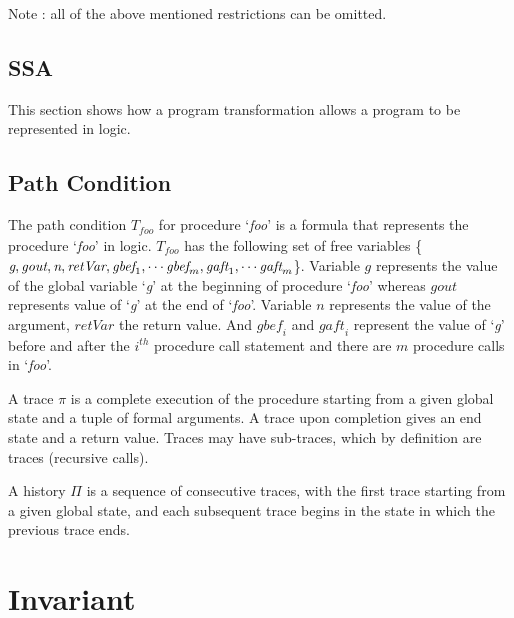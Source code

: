 \documentclass{llncs}
\newcommand{\foo}{\textit{foo}}
\newcommand{\trace}{\pi}
\newcommand{\history}{\Pi}
\newcommand{\pathCondition}{\mathit{T_{\foo}}}
\newcommand{\retVar}{\textit{retVar}}
\newcommand{\n}{\textit{n}}
\newcommand{\g}{\textit{g}}
\newcommand{\gout}{\textit{gout}}
\newcommand{\gbef}{\textit{gbef}}
\newcommand{\gaft}{\textit{gaft}}
\begin{document}
Note : all of the above mentioned restrictions can be omitted.
\subsection{SSA}
This section shows how a program transformation allows a program to be
represented in logic.

\subsection{Path Condition}

  The path condition $\pathCondition$ for procedure `\foo' is a
  formula that represents the procedure `\foo' in logic.
  $\pathCondition$ has the following set of free variables \{$\g,
  \gout,\n,\\ \retVar, \gbef_1, \cdots \gbef_m, \gaft_1, \cdots
  \gaft_m$\}. Variable $\g$ represents the value of the global
  variable `\g' at the beginning of procedure `\foo' whereas $\gout$
  represents value of `\g' at the end of `\foo'. Variable $\n$
  represents the value of the argument, $\retVar$ the return
  value. And $\gbef_i$ and $\gaft_i$ represent the value of `\g' before
  and after the $i^{th}$ procedure call statement and there are $m$
  procedure calls in `\foo'.

\begin{definition}[trace]
  A trace $\trace$ is a complete execution of the procedure starting
  from a given global state and a tuple of formal arguments. A trace
  upon completion gives an end state and a return value. Traces may
  have sub-traces, which by definition are traces (recursive calls).
\end{definition}

\begin{definition}[history]
  A history $\history$ is a sequence of consecutive traces, with the
  first trace starting from a given global state, and each subsequent
  trace begins in the state in which the previous trace ends.
\end{definition}

\section{Invariant}
\end{document}

